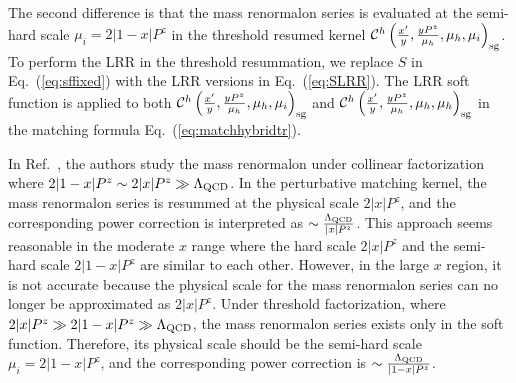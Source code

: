 \documentclass[a4paper,11pt]{article}
\begin{document}
The second difference is that the mass renormalon series is evaluated at the semi-hard scale $\mu_i=2|1-x|P^z$ in the threshold resumed kernel ${\cal C}^{h}\left(\frac{x'}{y},\frac{y P^z}{\mu_h},\mu_h,\mu_i\right)_{\rm sg}$. To perform the LRR in the threshold resummation, we replace $S$ in Eq.~(\ref{eq:sffixed}) with the LRR versions in Eq.~(\ref{eq:SLRR}). The LRR soft function is applied to both ${\cal C}^{h}\left(\frac{x'}{y},\frac{y P^z}{\mu_h},\mu_h,\mu_i\right)_{\rm sg}$ and
${\cal C}^{h}\left(\frac{x'}{y},\frac{y P^z}{\mu_h},\mu_h,\mu_h\right)_{\rm sg}$ in the matching formula Eq.~(\ref{eq:matchhybridtr}).


In Ref.~\cite{Zhang:2023bxs}, the authors study the mass renormalon under collinear factorization where $ 2 |1-x| P^z \sim 2 |x| P^z \gg \Lambda_{\rm QCD} $. In the perturbative matching kernel, the mass renormalon series is resummed at the physical scale $ 2 |x| P^z $, and the corresponding power correction is interpreted as $\sim \frac{\Lambda_{\rm QCD}}{|x|P^z}$. This approach seems reasonable in the moderate $x$ range where the hard scale $ 2 |x| P^z $ and the semi-hard scale $ 2 |1-x| P^z $ are similar to each other. However, in the large $x$ region, it is not accurate because the physical scale for the mass renormalon series can no longer be approximated as $ 2 |x| P^z $. Under threshold factorization, where $ 2 |x| P^z \gg 2 |1-x| P^z \gg \Lambda_{\rm QCD}$, the mass renormalon series exists only in the soft function. Therefore, its physical scale should be the semi-hard scale $\mu_i=2|1-x|P^z$, and the corresponding power correction is $\sim \frac{\Lambda_{\rm QCD}}{|1-x|P^z}$. 
\end{document}
